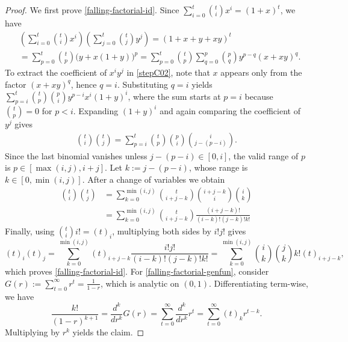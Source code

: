 \documentclass[preprint,5p,times,twocolumn]{elsarticle}
\begin{document}
\begin{proof}
We first prove \eqref{falling-factorial-id}. Since $\sum_{i=0}^t \binom{t}{i}x^i = (1+x)^t$, we have
\begin{align}
&\left(\sum_{i=0}^t \binom{t}{i}x^i \right)\left(\sum_{j=0}^t \binom{t}{j}y^j \right)
= (1+x+y+xy)^t \nonumber \\ 
&= \sum_{p=0}^t\binom{t}{p}\bigl(y + x(1+y)\bigr)^p = \sum_{p=0}^t \binom{t}{p} \sum_{q=0}^p \binom{p}{q}y^{p-q}(x+xy)^q. \label{stepC02}
\end{align}
To extract the coefficient of $x^iy^j$ in \eqref{stepC02}, note that $x$ appears only from the factor $(x+xy)^q$, hence $q=i$. Substituting $q=i$ yields $\sum_{p=i}^t \binom{t}{p} \binom{p}{i} y^{p-i} x^i(1+y)^i$, where the sum starts at $p=i$ because $\binom{t}{p}=0$ for $p<i$. Expanding $(1+y)^i$ and again comparing the coefficient of $y^j$ gives
\begin{align}
    \binom{t}{i}\binom{t}{j} =\sum_{p=i}^t \binom{t}{p} \binom{p}{i} \binom{i}{j-(p-i)}.\label{stepC03}
\end{align}
Since the last binomial vanishes unless $j-(p-i)\in[0,i]$, the valid range of $p$ is 
$p\in[\max(i,j),i+j]$. Let $k:=j-(p-i)$, whose range is $k\in[0,\min(i,j)]$. After a change of variables we obtain
\begin{align}
    \binom{t}{i}\binom{t}{j} &=\sum_{k=0}^{\min(i,j)} \binom{t}{i+j-k} \binom{i+j-k}{i} \binom{i}{k} \nonumber \\
    &= \sum_{k=0}^{\min(i,j)}  \binom{t}{i+j-k} \frac{(i+j-k)!}{(i-k)!(j-k)!k!}\label{stepC04}
\end{align}
Finally, using $\binom{t}{i}i!=(t)_i$, multiplying both sides by $i!j!$ gives 
\[
(t)_i(t)_j = \sum_{k=0}^{\min(i,j)} (t)_{i+j-k} \frac{i!j!}{(i-k)!(j-k)!k!} = \sum_{k=0}^{\min(i,j)}\binom{i}{k}\binom{j}{k}k!(t)_{i+j-k},
\]
which proves \eqref{falling-factorial-id}. For \eqref{falling-factorial-genfun}, consider $G(r):=\sum_{t=0}^\infty r^t=\frac{1}{1-r}$, which is analytic on $(0,1)$. Differentiating term-wise, we have
\[
\frac{k!}{(1-r)^{k+1}} =\frac{d^k}{d r^k}G(r) = \sum_{t=0}^{\infty} \frac{d^k}{dr^k}r^t = \sum_{t=0}^\infty (t)_k r^{t-k}. 
\]
Multiplying by $r^k$ yields the claim. 
\end{proof}
\end{document}
